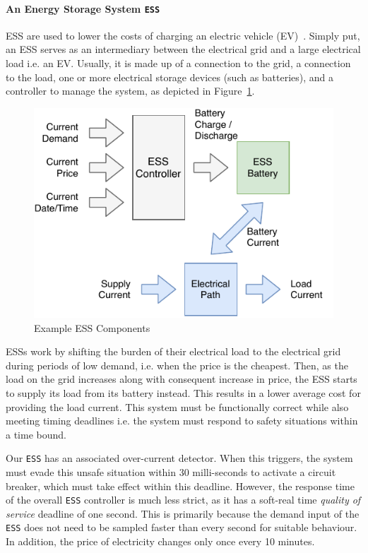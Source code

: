\paragraph{An Energy Storage System \texttt{ESS}}
\label{sec:ess}
\acf{ESS} are used to lower the costs of
charging an electric vehicle (EV)~\cite{chaudhari2017hybrid}. %
Simply put, an \ac{ESS} serves as an intermediary between the electrical grid and a large electrical load i.e. an EV.
Usually, it is made up of a connection to the grid, a connection to
the load, one or more electrical storage devices (such as batteries), and a controller to manage the system, as 
depicted in Figure~\ref{fig:ess-components}.

\begin{figure}[b]
	\vspace{-3mm}
	\centering
	\includegraphics[scale=0.68]{Content/fig/ess_components}
	\caption{Example \ac{ESS} Components\label{fig:ess-components}}
\end{figure}

\acp{ESS} work by shifting the burden of their electrical load to the
electrical grid during periods of low demand, i.e. when the price is the cheapest.
Then, as the load on the grid increases along with consequent increase
in price, the \ac{ESS} starts to supply its load from its battery instead. 
This results in a lower average cost for providing the load current. 
This system must be functionally correct while also meeting timing
deadlines i.e.
the system must respond to safety situations within a time bound. 

Our \texttt{ESS} has an associated
over-current detector.  When this triggers, the system must evade this
unsafe situation within 30 milli-seconds to activate a circuit
breaker, which must take effect within this deadline. 
However, the response time of the overall \texttt{ESS} controller is much less strict, as it has a soft-real time \textit{quality of service} deadline of one second.
This is primarily because the demand input of the \texttt{ESS} does not need to be sampled faster than every second for suitable behaviour.
In addition, the price of electricity changes only once every 10 minutes.

